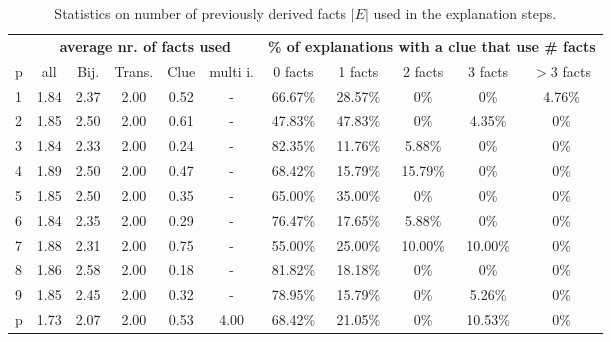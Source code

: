 \begin{table}[t]
	\centering
	\begin{tabular}{l|c|cccc|ccccc}
		& \multicolumn{5}{c|}{\bf average nr. of facts used} & \multicolumn{5}{c}{\bf \% of explanations with a clue that use \# facts}                                                                                \\
		p & all &  Bij. & Trans. &  Clue & multi i. & 0 facts & 1 facts & 2 facts & 3 facts & $>$3 facts \\\hline
		1 &  1.84 &  2.37 &   2.00 &  0.52 &        - &  66.67\% &  28.57\% &   0\% &   0\% &    4.76\% \\
		2 &  1.85 &  2.50 &   2.00 &  0.61 &        - &  47.83\% &  47.83\% &   0\% &   4.35\% &    0\% \\
		3 &  1.84 &  2.33 &   2.00 &  0.24 &        - &  82.35\% &  11.76\% &   5.88\% &   0\% &    0\% \\
		4 &  1.89 &  2.50 &   2.00 &  0.47 &        - &  68.42\% &  15.79\% &  15.79\% &   0\% &    0\% \\
		5 &  1.85 &  2.50 &   2.00 &  0.35 &        - &  65.00\% &  35.00\% &   0\% &   0\% &    0\% \\
		6 &  1.84 &  2.35 &   2.00 &  0.29 &        - &  76.47\% &  17.65\% &   5.88\% &   0\% &    0\% \\
		7 &  1.88 &  2.31 &   2.00 &  0.75 &        - &  55.00\% &  25.00\% &  10.00\% &  10.00\% &    0\% \\
		8 &  1.86 &  2.58 &   2.00 &  0.18 &        - &  81.82\% &  18.18\% &   0\% &   0\% &    0\% \\
		9 &  1.85 &  2.45 &   2.00 &  0.32 &        - &  78.95\% &  15.79\% &   0\% &   5.26\% &    0\% \\
		p &  1.73 &  2.07 &   2.00 &  0.53 &     4.00 &  68.42\% &  21.05\% &   0\% &  10.53\% &    0\% \\
	\end{tabular}
	\caption{Statistics on number of previously derived facts $|E|$ used in the explanation steps.
	}
	\label{table:sequence_level}
\end{table}


